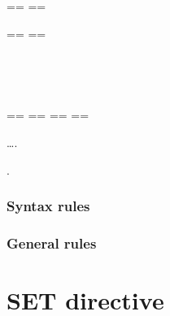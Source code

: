 \begin{syntax}
  \begin{0-1}
  \end{0-1}
  \begin{1=}
    \begin{1=}
      == \pseudotext == \\
      \identifier
    \end{1=}
    \begin{1=}
      == \pseudotext == \\
      \identifier
    \end{1=} \\

    \begin{1=}
       \\
    \end{1=}
    ==  ==
    ==  ==
  \end{1=}\ldots .
\end{syntax}

\begin{syntax}
  \begin{0-1}
  \end{0-1}
  .
\end{syntax}

\subsubsection{Syntax rules}

\subsubsection{General rules}

\section{SET directive}

\begin{syntax}[\miscextcolour]
  \begin{1=}
    \gnucobol{\directiveindicator} \\
    \textdollar
  \end{1=}
  \begin{1=}
     \\

     \\

     \\

  \end{1=}
\end{syntax}

